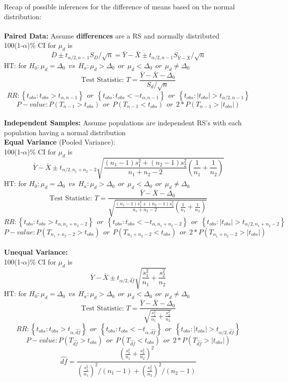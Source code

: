 \large Recap of possible inferences for the difference of means based on the normal distribution:\normalsize\\~\\
\textbf{Paired Data:}  Assume \textbf{differences} are a RS and normally distributed\\
100(1-$\alpha$)\% CI for $\mu_d$ is
$$\overline{D}\pm t_{\alpha/2,n-1}S_D/\sqrt{n} = \bar{Y}-\bar{X}\pm t_{\alpha/2,n-1}S_{\bar{Y}-\bar{X}}/\sqrt{n}$$
HT: for $H_0:\mu_d=\Delta_0~~vs~~H_a: \mu_d>\Delta_0~~or~~\mu_d<\Delta_0~~or~~\mu_d\neq\Delta_0$
$$\mbox{Test Statistic: } T=\frac{\bar{Y}-\bar{X}-\Delta_0}{S_d/\sqrt{n}}$$
$$RR: \left\{t_{obs}:t_{obs}>t_{\alpha,n-1}\right\}~~or~~\left\{t_{obs}:t_{obs}<-t_{\alpha,n-1}\right\}~~or~~\left\{t_{obs}:|t_{obs}|>t_{\alpha/2,n-1}\right\}$$
$$P-value: P(T_{n-1}>t_{obs})~~or~~P(T_{n-1}<t_{obs})~~or~~2*P(T_{n-1}>|t_{obs}|)$$
~\\
\textbf{Independent Samples:} Assume populations are independent RS's with each population having a normal distribution\\
\textbf{Equal Variance} (Pooled Variance):\\
100(1-$\alpha$)\% CI for $\mu_d$ is
$$\bar{Y}-\bar{X}\pm t_{\alpha/2,n_1+n_2-2}\sqrt{\frac{(n_1-1)s_1^2+(n_2-1)s_2^2}{n_1+n_2-2}\left(\frac{1}{n_1}+\frac{1}{n_2}\right)}$$
HT: for $H_0:\mu_d=\Delta_0~~vs~~H_a: \mu_d>\Delta_0~~or~~\mu_d<\Delta_0~~or~~\mu_d\neq\Delta_0$
$$\mbox{Test Statistic: } T=\frac{\bar{Y}-\bar{X}-\Delta_0}{\sqrt{\frac{(n_1-1)s_1^2+(n_2-1)s_2^2}{n_1+n_2-2}\left(\frac{1}{n_1}+\frac{1}{n_2}\right)}}$$
$$RR: \left\{t_{obs}:t_{obs}>t_{\alpha,n_1+n_2-2}\right\}~~or~~\left\{t_{obs}:t_{obs}<-t_{\alpha,n_1+n_2-2}\right\}~~or~~\left\{t_{obs}:|t_{obs}|>t_{\alpha/2,n_1+n_2-2}\right\}$$
$$P-value: P(T_{n_1+n_2-2}>t_{obs})~~or~~P(T_{n_1+n_2-2}<t_{obs})~~or~~2*P(T_{n_1+n_2-2}>|t_{obs}|)$$
~\\
\textbf{Unequal Variance:}\\
100(1-$\alpha$)\% CI for $\mu_d$ is
$$\bar{Y}-\bar{X}\pm t_{\alpha/2,\widehat{df}}\sqrt{\frac{s_1^2}{n_1}+\frac{s_2^2}{n_2}}$$
HT: for $H_0:\mu_d=\Delta_0~~vs~~H_a: \mu_d>\Delta_0~~or~~\mu_d<\Delta_0~~or~~\mu_d\neq\Delta_0$
$$\mbox{Test Statistic: } T=\frac{\bar{Y}-\bar{X}-\Delta_0}{\sqrt{\frac{s_1^2}{n_1}+\frac{s_2^2}{n_2}}}$$
$$RR: \left\{t_{obs}:t_{obs}>t_{\alpha,\widehat{df}}\right\}~~or~~\left\{t_{obs}:t_{obs}<-t_{\alpha,\widehat{df}}\right\}~~or~~\left\{t_{obs}:|t_{obs}|>t_{\alpha/2,\widehat{df}}\right\}$$
$$P-value: P(T_{\widehat{df}}>t_{obs})~~or~~P(T_{\widehat{df}}<t_{obs})~~or~~2*P(T_{\widehat{df}}>|t_{obs}|)$$
$$\widehat{df}=\frac{\left(\frac{s_1^2}{n_1}+\frac{s_2^2}{n_2}\right)^2}{\left(\frac{s_1^2}{n_1}\right)^2/(n_1-1)+\left(\frac{s_2^2}{n_2}\right)^2/(n_2-1)}$$

